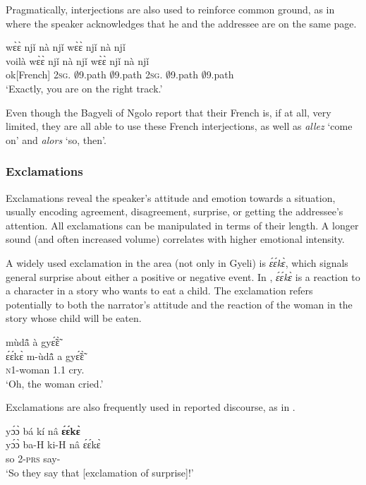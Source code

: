 Pragmatically, interjections are also used to reinforce common ground, as in  where the speaker acknowledges that he and the addressee are on the same page.

\ea \label{INTERJ2}
   wɛ̀ɛ̀ njǐ nà njǐ wɛ̀ɛ̀ njǐ nà njǐ\\
        voilà wɛ̀ɛ̀ njǐ nà njǐ wɛ̀ɛ̀ njǐ nà njǐ\\
          ok[French] 2\textsc{sg}.{\COP} $\emptyset$9.path {\CONJ} $\emptyset$9.path 2\textsc{sg}.{\COP} $\emptyset$9.path {\CONJ} $\emptyset$9.path\\
    \trans `Exactly, you are on the right track.'
\z

Even though the Bagyeli of Ngolo report that their French is, if at all, very limited, they are all able to use these French interjections, as well as {\itshape allez} `come on'  and {\itshape alors} `so, then'.

\subsubsection{Exclamations}
\label{sec:EXCL}

Exclamations reveal the speaker's attitude and emotion towards a situation, usually encoding agreement, disagreement, surprise, or getting the addressee's attention. All exclamations can be manipulated in terms of their length. A longer sound (and often increased volume) correlates with higher emotional intensity.

A widely used exclamation in the area (not only in Gyeli) is {\itshape  ɛ́ɛ́kɛ̀}, which signals general surprise about either a positive or negative event. In , {\itshape ɛ́ɛ́kɛ̀} is a reaction to a character in a story who wants to eat a child. The exclamation refers potentially to both the narrator's attitude and the reaction of the woman in the story whose child will be eaten.

\ea \label{eeke1}
   mùdã̂ à gyɛ̃́ɛ̃̀ \\
        ɛ́ɛ́kɛ̀ m-ùdã̂ a gyɛ̃́ɛ̃̀ \\
          {\EXCL} \textsc{n}1-woman 1.{\PST}1 cry.{\COMPL} \\
    \trans `Oh, the woman cried.'
\z


Exclamations are also frequently used in reported discourse, as in .

\ea \label{eeke}
  \glll  yɔ́ɔ̀ bá kí nâ {\bfseries ɛ́ɛ́kɛ̀} \\
            yɔ́ɔ̀ ba-H ki-H nâ ɛ́ɛ́kɛ̀ \\
         so 2-\textsc{prs} say-{\R} {\COMP} {\EXCL} \\
    \trans `So they say that [exclamation of surprise]!'
\z

